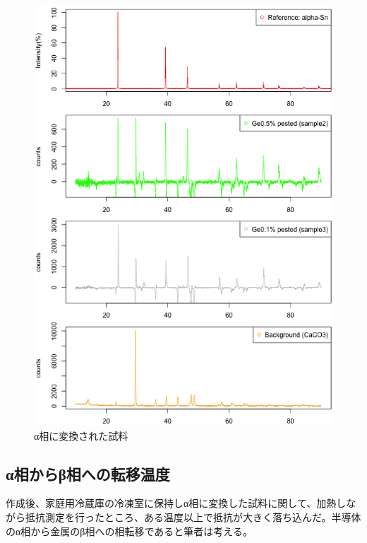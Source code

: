 \begin{figure}[htb]
    \begin{center}
   \includegraphics[width=150mm]{results_discussions/intensity_pested_samples.eps}
  \end{center}
  \caption{α相に変換された試料}
  \label{fig:intensity_pested_samples}
\end{figure}

\subsection{α相からβ相への転移温度}
作成後、家庭用冷蔵庫の冷凍室に保持しα相に変換した試料に関して、加熱しながら抵抗測定を行ったところ、ある温度以上で抵抗が大きく落ち込んだ。半導体のα相から金属のβ相への相転移であると筆者は考える。


